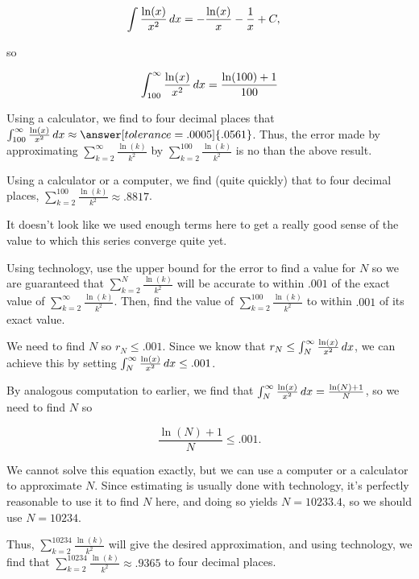 \documentclass{ximera}
\begin{document}
\begin{example}
\begin{example}
\begin{explanation}
\begin{align*}
\int  \frac{\ln(x)}{x^2} \mathop{}\!d x &= -\frac{\ln(x)}{x} - \frac{1}{x} +C,
\end{align*}

so 

\[
\int_{100}^{\infty} \frac{\ln(x)}{x^2} \mathop{}\!d x =\frac{\ln(100)+1}{100} 
\]

Using a calculator, we find to four decimal places that $\int_{100}^{\infty} \frac{\ln(x)}{x^2} \d x  \approx \answer[tolerance=.0005]{.0561}$.  Thus, the error made by approximating $\sum_{k=2}^{\infty}  \frac{\ln(k)}{k^2}$ by $\sum_{k=2}^{100}  \frac{\ln(k)}{k^2}$ is no  than the above result.

Using a calculator or a computer, we find (quite quickly) that to four decimal places, $\sum_{k=2}^{100}  \frac{\ln(k)}{k^2} \approx .8817$.

It doesn't look like we used enough terms here to get a really good sense of the value to which this series converge quite yet.

\end{explanation}
\end{example}

\begin{example}
Using technology, use the upper bound for the error to find a value for $N$ so we are guaranteed that  $\sum_{k=2}^{N}  \frac{\ln(k)}{k^2}$ will be accurate to within $.001$ of the exact value of $\sum_{k=2}^{\infty}  \frac{\ln(k)}{k^2}$.  Then, find the value of $\sum_{k=2}^{100} \frac{\ln(k)}{k^2}$ to within $.001$ of its exact value.

\begin{explanation}
We need to find $N$ so $r_N \leq .001$.  Since we know that $r_N \leq \int_N^\infty  \frac{\ln(x)}{x^2} \mathop{}\!d x$, we can achieve this by setting $\int_N^\infty  \frac{\ln(x)}{x^2} \mathop{}\!d x \leq .001$.  

By analogous computation to earlier, we find that $\int_N^\infty  \frac{\ln(x)}{x^2} \mathop{}\!d x = \frac{\ln(N)+1}{N}$, so we need to find $N$ so

\[
\frac{\ln(N)+1}{N} \leq .001  .
\]

We cannot solve this equation exactly, but we can use a computer or a calculator to approximate $N$.  Since estimating is usually done with technology, it's perfectly reasonable to use it to find $N$ here, and doing so yields $N = 10233.4$, so we should use $N=10234$.

Thus, $\sum_{k=2}^{10234} \frac{\ln(k)}{k^2}$ will give the desired approximation, and using technology, we find that $\sum_{k=2}^{10234} \frac{\ln(k)}{k^2} \approx .9365$ to four decimal places.


\end{explanation}
\end{example}
\end{example}
\end{document}
